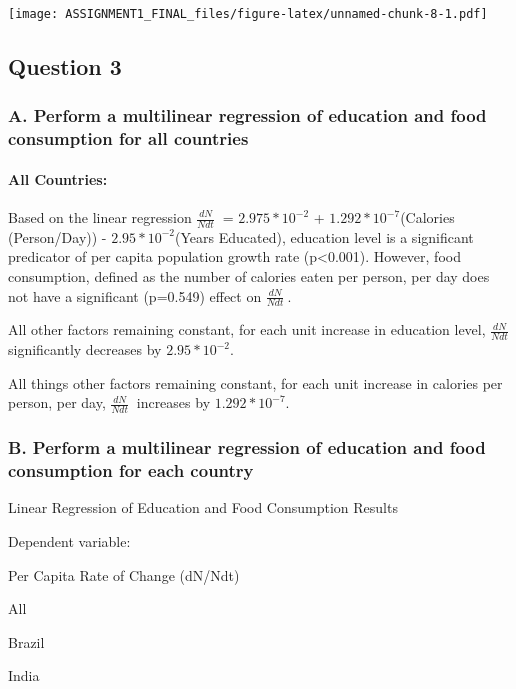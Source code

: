 \documentclass[]{article}
\let\oldparagraph\paragraph
\renewcommand{\paragraph}[1]{\oldparagraph{#1}\mbox{}}
\begin{document}
\texttt{[image: ASSIGNMENT1\_FINAL\_files/figure-latex/unnamed-chunk-8-1.pdf]}

\subsection{Question 3}\label{question-3}

\subsubsection{A. Perform a multilinear regression of education and food
consumption for all
countries}\label{a.-perform-a-multilinear-regression-of-education-and-food-consumption-for-all-countries}

\paragraph{All Countries:}\label{all-countries}

Based on the linear regression \(\frac{dN}{Ndt}\ \) = \(2.975*10^{-2}\)
+ \(1.292*10^{-7}\)(Calories (Person/Day)) - \(2.95*10^{-2}\)(Years
Educated), education level is a significant predicator of per capita
population growth rate (p\textless{}0.001). However, food consumption,
defined as the number of calories eaten per person, per day does not
have a significant (p=0.549) effect on \(\frac{dN}{Ndt}\ \).

All other factors remaining constant, for each unit increase in
education level, \(\frac{dN}{Ndt}\ \) significantly decreases by
\(2.95*10^{-2}\).

All things other factors remaining constant, for each unit increase in
calories per person, per day, \(\frac{dN}{Ndt}\ \) increases by
\(1.292*10^{-7}\).

\subsubsection{B. Perform a multilinear regression of education and food
consumption for each
country}\label{b.-perform-a-multilinear-regression-of-education-and-food-consumption-for-each-country}

Linear Regression of Education and Food Consumption Results

Dependent variable:

Per Capita Rate of Change (dN/Ndt)

All

Brazil

India
\end{document}

